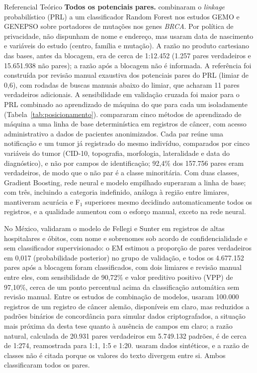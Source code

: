 \begin{chapter}{Referencial Teórico}
\textbf{Todos os potenciais pares.}  combinaram o \textit{linkage} probabilístico (PRL) a um classificador Random Forest nos estudos GEMO e GENEPSO sobre portadores de mutações nos genes \textit{BRCA}. Por política de privacidade, não dispunham de nome e endereço, mas usaram data de nascimento e variáveis do estudo (centro, família e mutação). A razão no produto cartesiano das bases, antes da blocagem, era de cerca de 1:12.452 (1.257 pares verdadeiros e 15.651.938 não pares); a razão após a blocagem não é informada. A referência foi construída por revisão manual exaustiva dos potenciais pares do PRL (limiar de 0,6), com rodadas de buscas manuais abaixo do limiar, que acharam 11 pares verdadeiros adicionais. A sensibilidade em validação cruzada foi maior para o PRL combinado ao aprendizado de máquina do que para cada um isoladamente (Tabela~\ref{tab:posicionamento}).  compararam cinco métodos de aprendizado de máquina a uma linha de base determinística em registros de câncer, com acesso administrativo a dados de pacientes anonimizados. Cada par reúne uma notificação e um tumor já registrado do mesmo indivíduo, comparados por cinco variáveis do tumor (CID-10, topografia, morfologia, lateralidade e data do diagnóstico), e não por campos de identificação; 92,4\% dos 157.756 pares eram verdadeiros, de modo que o não par é a classe minoritária. Com duas classes, Gradient Boosting, rede neural e modelo empilhado superaram a linha de base; com três, incluindo a categoria indefinido, análoga à região entre limiares, mantiveram acurácia e F$_1$ superiores mesmo decidindo automaticamente todos os registros, e a qualidade aumentou com o esforço manual, exceto na rede neural.

No México,  validaram o modelo de Fellegi e Sunter em registros de altas hospitalares e óbitos, com nome e sobrenomes sob acordo de confidencialidade e sem classificador supervisionado: o EM estimou a proporção de pares verdadeiros em 0,017 (probabilidade posterior) no grupo de validação, e todos os 4.677.152 pares após a blocagem foram classificados, com dois limiares e revisão manual entre eles, com sensibilidade de 90,72\% e valor preditivo positivo (VPP) de 97,10\%, cerca de um ponto percentual acima da classificação automática sem revisão manual. Entre os estudos de combinação de modelos,  usaram 100.000 registros de um registro de câncer alemão, disponíveis em claro, mas reduzidos a padrões binários de concordância para simular dados criptografados, a situação mais próxima da desta tese quanto à ausência de campos em claro; a razão natural, calculada de 20.931 pares verdadeiros em 5.749.132 padrões, é de cerca de 1:274, reamostrada para 1:1, 1:5 e 1:20.  usaram dados sintéticos, e a razão de classes não é citada porque os valores do texto divergem entre si. Ambos classificaram todos os pares.


\end{chapter}
